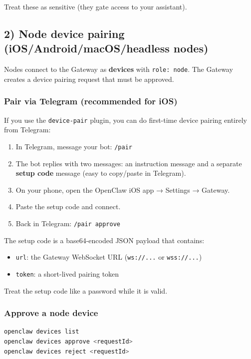 Treat these as sensitive (they gate access to your assistant).

\subsection{2) Node device pairing (iOS/Android/macOS/headless nodes)}


Nodes connect to the Gateway as \textbf{devices} with \texttt{role: node}. The Gateway
creates a device pairing request that must be approved.

\subsubsection{Pair via Telegram (recommended for iOS)}


If you use the \texttt{device-pair} plugin, you can do first-time device pairing entirely from Telegram:

\begin{enumerate}
  \item In Telegram, message your bot: \texttt{/pair}
  \item The bot replies with two messages: an instruction message and a separate \textbf{setup code} message (easy to copy/paste in Telegram).
  \item On your phone, open the OpenClaw iOS app → Settings → Gateway.
  \item Paste the setup code and connect.
  \item Back in Telegram: \texttt{/pair approve}
\end{enumerate}


The setup code is a base64-encoded JSON payload that contains:

\begin{itemize}
  \item \texttt{url}: the Gateway WebSocket URL (\texttt{ws://...} or \texttt{wss://...})
  \item \texttt{token}: a short-lived pairing token
\end{itemize}


Treat the setup code like a password while it is valid.

\subsubsection{Approve a node device}


\begin{lstlisting}[language=bash]
openclaw devices list
openclaw devices approve <requestId>
openclaw devices reject <requestId>
\end{lstlisting}


